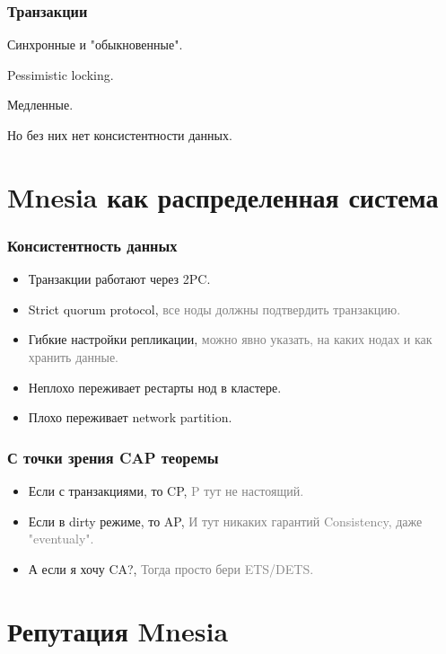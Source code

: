 \documentclass[10pt]{beamer}
\begin{document}
\begin{frame}
\frametitle{Транзакции}
\centering
Синхронные и "обыкновенные".
\par \bigskip
Pessimistic locking.
\par \bigskip
Медленные.
\par \bigskip
Но без них нет консистентности данных.
\end{frame}

\section{Mnesia как распределенная система}

\begin{frame}
\frametitle{Консистентность данных}
\begin{itemize}[<+->]
\item Транзакции работают через 2PC.
\item Strict quorum protocol,\newline
  \textcolor{gray}{все ноды должны подтвердить транзакцию.}
\item Гибкие настройки репликации,\newline
  \textcolor{gray}{можно явно указать, на каких нодах и как хранить данные.}
\item Неплохо переживает рестарты нод в кластере.
\item Плохо переживает network partition.
\end{itemize}
\end{frame}

\begin{frame}
\frametitle{С точки зрения CAP теоремы}
\begin{itemize}[<+->]
\item Если с транзакциями, то CP,\newline
  \textcolor{gray}{P тут не настоящий.}
\item Если в dirty режиме, то AP,\newline
  \textcolor{gray}{И тут никаких гарантий Consistency, даже "eventualy".}
\item А если я хочу CA?,\newline
  \textcolor{gray}{Тогда просто бери ETS/DETS.}
\end{itemize}
\end{frame}

\section{Репутация Mnesia}
\end{document}
